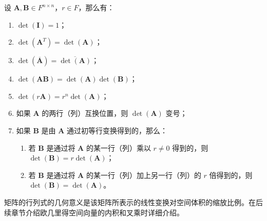 \vspace{1em}

\begin{proposition}[行列式的性质]
    设 $\mathbf{A},\mathbf{B} \in F^{n \times n}$，$r\in F$，那么有：
    \begin{enumerate}
        \item $\det(\mathbf{I}) = 1$；
        \item $\det(\mathbf{A}^T) = \det(\mathbf{A})$；
        \item $\det(\overline{\mathbf{A}}) = \overline{\det(\mathbf{A})}$；
        \item $\det(\mathbf{A}\mathbf{B}) = \det(\mathbf{A})\det(\mathbf{B})$；
        \item $\det(r\mathbf{A}) = r^n \det(\mathbf{A})$；
        \item 如果 $\mathbf{A}$ 的两行（列）互换位置，则 $\det(\mathbf{A})$ 变号；
        \item 如果 $\mathbf{B}$ 是由 $\mathbf{A}$ 通过初等行变换得到的，那么：
        \begin{enumerate}
            \item 若 $\mathbf{B}$ 是通过将 $\mathbf{A}$ 的某一行（列）乘以 $r\neq 0$ 得到的，则 $\det(\mathbf{B}) = r\det(\mathbf{A})$；
            \item 若 $\mathbf{B}$ 是通过将 $\mathbf{A}$ 的某一行（列）加上另一行（列）的 $r$ 倍得到的，则 $\det(\mathbf{B}) = \det(\mathbf{A})$。
        \end{enumerate}
    \end{enumerate}
    \label{prop:determinant_property}
\end{proposition}
\vspace{1em}

\begin{note}
    矩阵的行列式的几何意义是该矩阵所表示的线性变换对空间体积的缩放比例。在后续章节介绍欧几里得空间向量的内积和叉乘时详细介绍。
\end{note}


